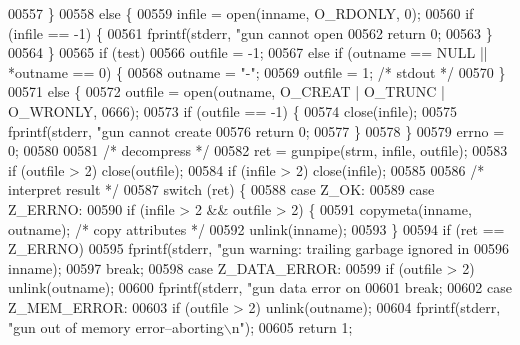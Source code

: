 \begin{DoxyCode}
00557     \}
00558     \textcolor{keywordflow}{else} \{
00559         infile = open(inname, O\_RDONLY, 0);
00560         \textcolor{keywordflow}{if} (infile == -1) \{
00561             fprintf(stderr, \textcolor{stringliteral}{"gun cannot open %
00562             \textcolor{keywordflow}{return} 0;
00563         \}
00564     \}
00565     \textcolor{keywordflow}{if} (test)
00566         outfile = -1;
00567     \textcolor{keywordflow}{else} \textcolor{keywordflow}{if} (outname == NULL || *outname == 0) \{
00568         outname = \textcolor{stringliteral}{"-"};
00569         outfile = 1;    \textcolor{comment}{/* stdout */}
00570     \}
00571     \textcolor{keywordflow}{else} \{
00572         outfile = open(outname, O\_CREAT | O\_TRUNC | O\_WRONLY, 0666);
00573         \textcolor{keywordflow}{if} (outfile == -1) \{
00574             close(infile);
00575             fprintf(stderr, \textcolor{stringliteral}{"gun cannot create %
00576             \textcolor{keywordflow}{return} 0;
00577         \}
00578     \}
00579     errno = 0;
00580 
00581     \textcolor{comment}{/* decompress */}
00582     ret = gunpipe(strm, infile, outfile);
00583     \textcolor{keywordflow}{if} (outfile > 2) close(outfile);
00584     \textcolor{keywordflow}{if} (infile > 2) close(infile);
00585 
00586     \textcolor{comment}{/* interpret result */}
00587     \textcolor{keywordflow}{switch} (ret) \{
00588     \textcolor{keywordflow}{case} Z\_OK:
00589     \textcolor{keywordflow}{case} Z\_ERRNO:
00590         \textcolor{keywordflow}{if} (infile > 2 && outfile > 2) \{
00591             copymeta(inname, outname);          \textcolor{comment}{/* copy attributes */}
00592             unlink(inname);
00593         \}
00594         \textcolor{keywordflow}{if} (ret == Z\_ERRNO)
00595             fprintf(stderr, \textcolor{stringliteral}{"gun warning: trailing garbage ignored in %
00596                     inname);
00597         \textcolor{keywordflow}{break};
00598     \textcolor{keywordflow}{case} Z\_DATA\_ERROR:
00599         \textcolor{keywordflow}{if} (outfile > 2) unlink(outname);
00600         fprintf(stderr, \textcolor{stringliteral}{"gun data error on %
00601         \textcolor{keywordflow}{break};
00602     \textcolor{keywordflow}{case} Z\_MEM\_ERROR:
00603         \textcolor{keywordflow}{if} (outfile > 2) unlink(outname);
00604         fprintf(stderr, \textcolor{stringliteral}{"gun out of memory error--aborting\(\backslash\)n"});
00605         \textcolor{keywordflow}{return} 1;
}}}}
\end{DoxyCode}
